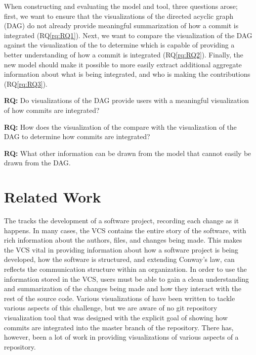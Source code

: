 When constructing and evaluating the model and tool, three questions
arose; first, we want to ensure that the visualizations of the directed
acyclic graph (DAG) do not already provide meaningful summarization of
how a commit is integrated (RQ\ref{rq:RQ1}). Next, we want to compare
the visualization of the DAG against the visualization of the \mt{} to
determine which is capable of providing a better understanding of how a
commit is integrated (RQ\ref{rq:RQ2}). Finally, the new model should
make it possible to more easily extract additional aggregate information
about what is being integrated, and who is making the contributions
(RQ\ref{rq:RQ3}).

\begin{textbox}
  \textbf{RQ:} Do visualizations of the DAG provide
  users with a meaningful visualization of how commits are integrated?
\end{textbox}

\begin{textbox}
  \textbf{RQ:} How does the visualization of the \mt{}
  compare with the visualization of the DAG to determine how commits are
  integrated?
\end{textbox}

\begin{textbox}
  \textbf{RQ:} What other information can be drawn from the
  \mt{} model that cannot easily be drawn from the DAG.
\end{textbox}


\section{Related Work}\label{sec:related_work}

The  tracks the development of a
software project, recording each change as it happens. In many cases,
the VCS contains the entire story of the software, with rich information
about the authors, files, and changes being made. This makes the VCS
vital in providing information about how a software project is being
developed, how the software is structured, and extending Conway's law,
can reflects the communication structure within an organization. In
order to use the information stored in the VCS, users must be able to
gain a clean understanding and summarization of the changes being made
and how they interact with the rest of the source code. Various
visualizations of have been written to tackle various aspects of this
challenge, but we are aware of no git repository visualization tool that
was designed with the explicit goal of showing how commits are
integrated into the master branch of the repository. There has, however,
been a lot of work in providing visualizations of various aspects of a
repository.

